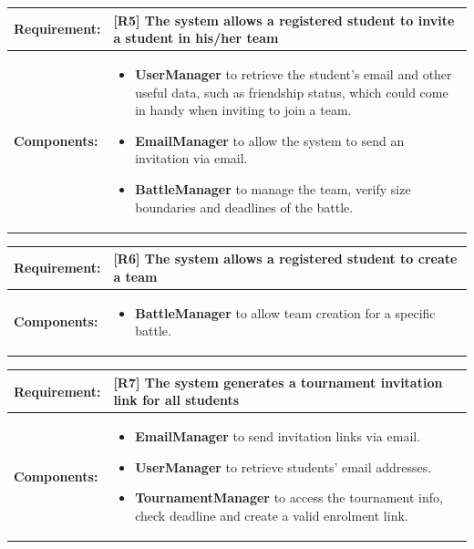 \documentclass[12pt,oneside,a4paper]{article}
\begin{document}
\begin{table}[htbp]
\begin{tabular}{|l|p{12cm}|}
    \hline
    \textbf{Requirement:} & [R5] The system allows a registered student to invite a student in his/her team\\
    \hline
    \textbf{Components:} & \begin{itemize}
        \item \textbf{UserManager} to retrieve the student's email and other useful data, such as friendship status, which could come in handy when inviting to join a team.
        \item \textbf{EmailManager} to allow the system to send an invitation via email.
        \item \textbf{BattleManager} to manage the team, verify size boundaries and deadlines of the battle.
    \end{itemize}\\
    \hline
\end{tabular}
\end{table}

\begin{table}[htbp]
\begin{tabular}{|l|p{12cm}|}
    \hline
    \textbf{Requirement:} & [R6] The system allows a registered student to create a team\\
    \hline
    \textbf{Components:} & \begin{itemize}
        \item \textbf{BattleManager} to allow team creation for a specific battle.
    \end{itemize}\\
    \hline
\end{tabular}
\end{table}

\begin{table}[htbp]
\begin{tabular}{|l|p{12cm}|}
    \hline
    \textbf{Requirement:} & [R7] The system generates a tournament invitation link for all students\\
    \hline
    \textbf{Components:} & \begin{itemize}
        \item \textbf{EmailManager} to send invitation links via email.
        \item \textbf{UserManager} to retrieve students' email addresses.
        \item \textbf{TournamentManager} to access the tournament info, check deadline and create a valid enrolment link.
    \end{itemize}\\
    \hline
\end{tabular}
\end{table}
\end{document}
